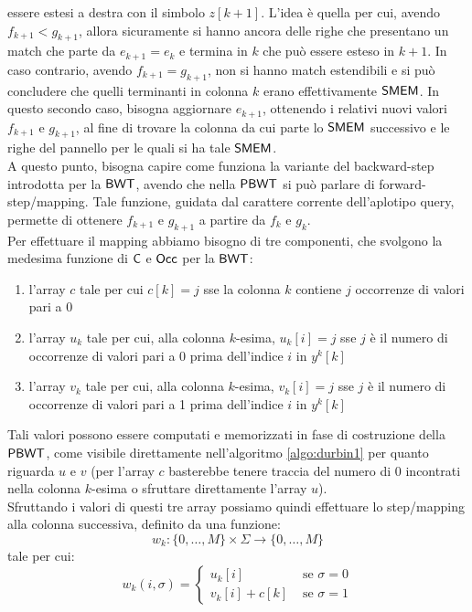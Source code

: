 essere estesi 
a destra con il simbolo $z[k+1]$. L'idea è quella per cui, avendo
$f_{k+1}<g_{k+1}$, allora sicuramente si hanno ancora delle righe che presentano un
match che parte da $e_{k+1}=e_{k}$ e termina in $k$ che può essere esteso in
$k+1$. In caso contrario, avendo $f_{k+1}=g_{k+1}$, non si hanno match
estendibili e si può concludere che quelli terminanti in colonna $k$
erano effettivamente $\mbox{\rm {\sf SMEM}}$. In questo secondo caso, bisogna aggiornare
$e_{k+1}$, 
ottenendo i relativi nuovi valori $f_{k+1}$ e $g_{k+1}$, al fine di trovare la
colonna da cui parte lo $\mbox{\rm {\sf SMEM}}$ successivo e le righe del pannello per le quali
si ha tale $\mbox{\rm {\sf SMEM}}$. \\
A questo punto, bisogna capire come funziona la
variante del backward-step introdotta per la $\mbox{\rm {\sf BWT}}$, avendo che nella $\mbox{\rm {\sf PBWT}}$ si
può parlare di forward-step/mapping. Tale funzione,
guidata dal carattere corrente dell'aplotipo query, permette di ottenere
$f_{k+1}$ e $g_{k+1}$ a partire da $f_k$ e $g_k$.\\ 
Per effettuare il mapping abbiamo bisogno di tre componenti, che
svolgono la medesima funzione di $\mbox{\rm {\sf C}}$ e $\mbox{\rm {\sf Occ}}$ per la
$\mbox{\rm {\sf BWT}}$: 
\begin{enumerate}
  \item l'array $c$ tale per cui $c[k]=j$ sse la colonna $k$ contiene $j$
  occorrenze di valori pari a 0
  \item l'array $u_k$ tale per cui, alla colonna $k$-esima, $u_k[i]=j$ sse $j$ è
  il numero di occorrenze di valori pari a 0 prima dell'indice $i$ in $y^k[k]$ 
  \item l'array $v_k$ tale per cui, alla colonna $k$-esima, $v_k[i]=j$ sse $j$ è
  il numero di occorrenze di valori pari a 1 prima dell'indice $i$ in $y^k[k]$ 
\end{enumerate}
Tali valori possono essere computati e memorizzati in fase di costruzione della
$\mbox{\rm {\sf PBWT}}$, come visibile direttamente nell'algoritmo \ref{algo:durbin1} per
quanto riguarda $u$ e $v$ (per l'array $c$ basterebbe tenere traccia del numero
di 0 incontrati nella colonna $k$-esima o sfruttare direttamente l'array $u$).\\
Sfruttando i valori di questi tre array possiamo quindi effettuare lo
step/mapping alla colonna successiva,
definito da una funzione:
\begin{equation}
  \label{eq:pbwtw1}
  w_k:\{0,\ldots,M\}\times\Sigma\to \{0,\ldots,M\}
\end{equation}
tale per cui:
\begin{equation}
  \label{eq:pbwtw2}
  w_k(i,\sigma)=
  \begin{cases}
    u_k[i]&\mbox{ se }\sigma=0\\
    v_k[i]+c[k]&\mbox{ se }\sigma=1
  \end{cases}
\end{equation}
